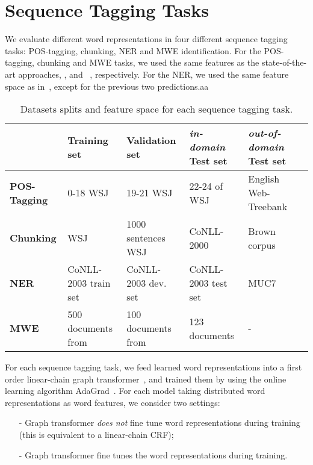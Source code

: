 \section{Sequence Tagging Tasks}
\label{sec:SeqTagging}
We evaluate different word representations in four different sequence tagging tasks: POS-tagging, chunking, NER and MWE identification. 
For the POS-tagging, chunking and MWE tasks, we used the same features as the state-of-the-art approaches,  ,  and ~, respectively. 
For the NER, we used the same feature space as in~, except for the previous two predictions.aa

\begin{table*}
\caption{Datasets splits and feature space for each sequence tagging task.}
\begin{small}
\begin{tabular}{lllp{}ll}
\hline
			& \textbf{Training set} & \textbf{Validation set} & \textbf{\textit{in-domain} Test set} & \textbf{\textit{out-of-domain} Test set} \\ \hline
\textbf{POS-Tagging} & 0-18 WSJ & 19-21 WSJ & 22-24 of WSJ & English Web-Treebank  \\
\textbf{Chunking} & WSJ & 1000 sentences WSJ & CoNLL-2000 & Brown corpus \\
\textbf{NER} & CoNLL-2003 train set & CoNLL-2003 dev. set & CoNLL-2003 test set & MUC7  \\
\textbf{MWE} & 500 documents from & 100 documents from & 123 documents & - \\
\hline
\end{tabular}
\label{datasplit}
\end{small}
\end{table*}

For each sequence tagging task, we feed learned word representations into a first order linear-chain graph
transformer~\cite{collobert2011natural}, and trained them by using the online learning algorithm
AdaGrad~\cite{duchi2011adaptive}.
For each model taking distributed word representations as word features, we consider two settings: 

\begin{small}
\begin{itemize}
\item[-] Graph transformer \textit{does not} fine tune word representations during training (this is equivalent to a linear-chain CRF);
\item[-] Graph transformer fine tunes the word representations during training.
\end{itemize}
\end{small}

